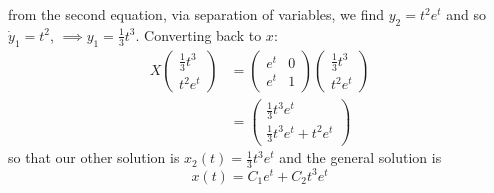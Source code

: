 \documentclass{article}
\begin{document}
\begin{itemize}
\begin{itemize}
        from the second equation, via separation of variables, we find $y_2 = t^2e^t$ and so $\dot{y}_1 = t^2$, $\implies y_1 = \tfrac{1}{3}t^3$. Converting back to $x$:
        \begin{align*}
            X\begin{pmatrix}
                \tfrac{1}{3}t^3\\
                t^2e^t
            \end{pmatrix} &= \begin{pmatrix}
                e^t & 0\\
                e^t & 1
            \end{pmatrix}\begin{pmatrix}
                \tfrac{1}{3}t^3\\
                t^2e^t
            \end{pmatrix}\\
            &=\begin{pmatrix}
                \tfrac{1}{3}t^3e^t\\
                \tfrac{1}{3}t^3e^t + t^2e^t
            \end{pmatrix}
        \end{align*}
        so that our other solution is $x_2(t) = \tfrac{1}{3}t^3e^t$ and the general solution is
        \[x(t) = C_1e^t + C_2t^3e^t\]
        



\end{itemize}
\end{itemize}
\end{document}
